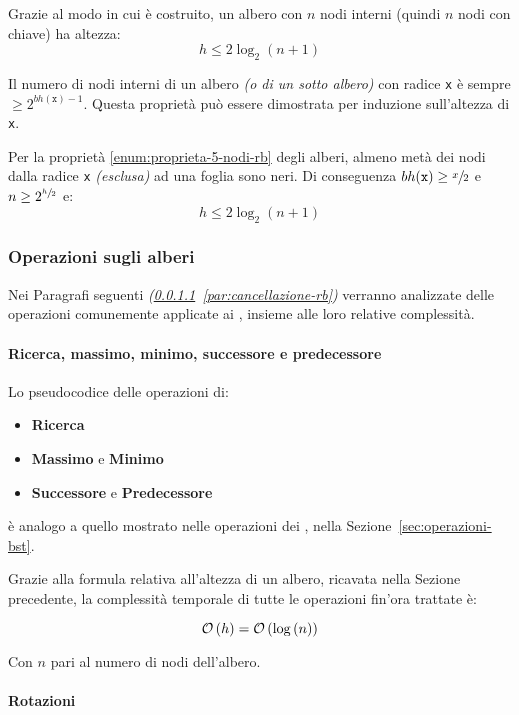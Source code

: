 \documentclass[italian, 10pt]{article}
\begin{document}
\bigskip
Grazie al modo in cui è costruito, un albero \RB con \(n\) nodi interni (quindi \(n\) nodi con chiave) ha altezza:
\[h \leq 2 \log_2{(n+1)}\]

Il numero di nodi interni di un albero \textit{(o di un sotto albero)} con radice \texttt{x} è sempre \(\geq 2^{bh(\texttt{x})-1}\).
Questa proprietà può essere dimostrata per induzione sull'altezza di \texttt{x}.

Per la proprietà \ref{enum:proprieta-5-nodi-rb} degli alberi, almeno metà dei nodi dalla radice \texttt{x} \textit{(esclusa)} ad una foglia sono neri.
Di conseguenza \(bh(\texttt{x}) \geq \sfrac{x}{2}\) e \(n \geq 2^{\sfrac{h}{2}}\) e:
\[ h \leq 2 \log_2{(n+1)} \]

\subsubsection{Operazioni sugli alberi \RB}

Nei Paragrafi seguenti \textit{(\ref{par:operazioni-rb-analoghe-a-bst}~\ref{par:cancellazione-rb})} verranno analizzate delle operazioni comunemente applicate ai \BST, insieme alle loro relative complessità.

\paragraph{Ricerca, massimo, minimo, successore e predecessore}
\label{par:operazioni-rb-analoghe-a-bst}

Lo pseudocodice delle operazioni di:

\begin{itemize}
  \item \textbf{Ricerca}
  \item \textbf{Massimo} e \textbf{Minimo}
  \item \textbf{Successore} e \textbf{Predecessore}
\end{itemize}

è analogo a quello mostrato nelle operazioni dei \BST, nella Sezione~\ref{sec:operazioni-bst}.

Grazie alla formula relativa all'altezza di un albero, ricavata nella Sezione precedente, la complessità temporale di tutte le operazioni fin'ora trattate è:

\[ \mathcal{O}\left(h\right) = \mathcal{O}\left(\log{(n)}\right)\]

Con \(n\) pari al numero di nodi dell'albero.

\paragraph{Rotazioni}
\label{par:rotazioni-rb}
\end{document}
